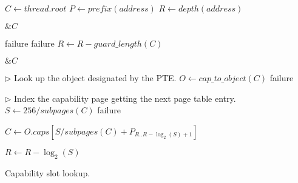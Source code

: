 \begin{algorithm}
\begin{algorithmic}[1]
  \State $C \gets \mathit{thread.root}$
  \State $P \gets \mathit{prefix}(\mathit{address})$
  \State $R \gets \mathit{depth}(\mathit{address})$
  \Statex

  \Loop
   \label{alg:before-guard-check-start}
    \State \Return $\&C$
  \EndIf \label{alg:before-guard-check-end}
  \Statex

   \label{alg:guard-compare-start}
    \State \Return failure
  \EndIf
    \State \Return failure
  \EndIf
  \State $R \gets R - \mathit{guard\_length}(C)$ \label{alg:guard-compare-end}

  \Statex
   \label{alg:after-guard-check-start}
    \State \Return $\&C$
  \EndIf \label{alg:after-guard-check-end}

  \Statex
  \State $\triangleright$ Look up the object designated by the PTE.
  \State $O \gets \mathit{cap\_to\_object}(C)$ \label{alg:object-lookup}
    \State \Return failure 
  \EndIf

  \Statex
  \State $\triangleright$ Index the capability page getting the next
  page table entry.
  \State $S \gets 256/\mathit{subpages}(C)$ 
  \label{alg:subpage-index-start}
    \State \Return failure
  \EndIf

  \State $C \gets
    O.\mathit{caps}\left[S/\mathit{subpages}(C)
    + P_{R..R-\log_2(S)+1}\right]$

  \State $R \gets R - \log_2(S)$ \label{alg:subpage-index-end}
\EndLoop
\EndFunction
\end{algorithmic}
\caption{Capability slot lookup.}
\label{alg:capability-lookup}
\end{algorithm}


